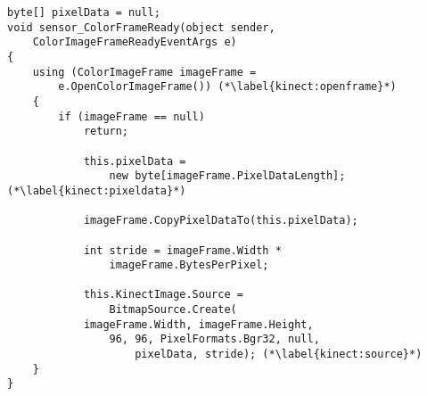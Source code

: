 \begin{lstlisting}[style=csharp,caption={Visning af billeddata fra Kinectens RGB-kamera}, label=kinect:picture]
byte[] pixelData = null;
void sensor_ColorFrameReady(object sender,
	ColorImageFrameReadyEventArgs e)
{
    using (ColorImageFrame imageFrame = 
    	e.OpenColorImageFrame()) (*\label{kinect:openframe}*)
    {
        if (imageFrame == null)
            return;

            this.pixelData = 
            	new byte[imageFrame.PixelDataLength];(*\label{kinect:pixeldata}*)

            imageFrame.CopyPixelDataTo(this.pixelData);

            int stride = imageFrame.Width *
            	imageFrame.BytesPerPixel;

            this.KinectImage.Source = 
            	BitmapSource.Create(
            imageFrame.Width, imageFrame.Height, 
            	96, 96, PixelFormats.Bgr32, null, 
            		pixelData, stride); (*\label{kinect:source}*)
    }
}    
\end{lstlisting}